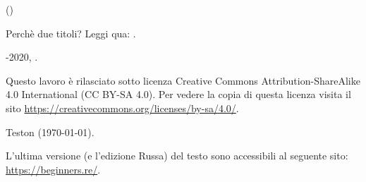 ﻿\begin{titlepage}


\end{titlepage}

\newpage

\begin{center}
\vspace*{\fill}
{\LARGE \TitleMain}

\bigskip

{\large (\TitleAux)}

\bigskip
\bigskip
Perchè due titoli? Leggi qua: .

\vspace*{\fill}

{\large \AUTHOR}

{\large \TT{\EMAILPRI}}
\vspace*{\fill}
\vfill

\ccbysa

-2020, \AUTHOR.

Questo lavoro è rilasciato sotto licenza Creative Commons Attribution-ShareAlike 4.0 International (CC BY-SA 4.0).
Per vedere la copia di questa licenza visita il sito \url{https://creativecommons.org/licenses/by-sa/4.0/}.

Teston ({\large \today}).

L'ultima versione (e l'edizione Russa) del testo sono accessibili al seguente sito: \url{https://beginners.re/}.

\end{center}
